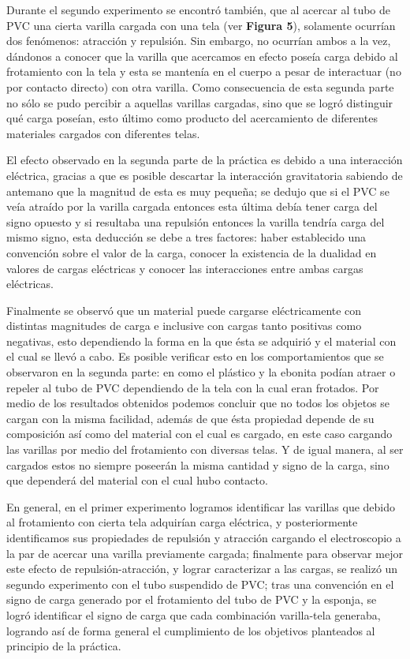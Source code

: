 \documentclass[letterpaper, 11 pt]{article}
\begin{document}
\begin{multicols*}{2}

Durante el segundo experimento se encontró también,  que al acercar al tubo de PVC una cierta varilla cargada con una tela (ver \textbf{Figura 5}), solamente ocurrían dos fenómenos: atracción y repulsión. Sin embargo, no ocurrían ambos a la vez, dándonos a conocer que la varilla que acercamos en efecto poseía carga debido al frotamiento con la tela y esta se mantenía en el cuerpo a pesar de interactuar (no por contacto directo) con otra varilla. Como consecuencia de esta segunda parte no sólo se pudo percibir a aquellas varillas cargadas, sino que se logró distinguir qué carga poseían, esto último como producto del acercamiento de diferentes materiales cargados con diferentes telas.

El efecto observado en la segunda parte de la práctica es debido a una interacción eléctrica, gracias a que es posible descartar la interacción gravitatoria sabiendo de antemano que la magnitud de esta es muy pequeña; se dedujo que si el PVC se veía atraído por la varilla cargada entonces esta última debía tener carga del signo opuesto y si resultaba una repulsión entonces la varilla tendría carga del mismo signo, esta deducción se debe a tres factores: haber establecido una convención sobre el valor de la carga, conocer la existencia de la dualidad en valores de cargas eléctricas y conocer las interacciones entre ambas cargas eléctricas. 

Finalmente se observó que un material puede cargarse eléctricamente con distintas magnitudes de carga e inclusive con cargas tanto positivas como negativas, esto dependiendo la forma en la que ésta se adquirió y el material con el cual se llevó a cabo. Es posible verificar esto en los comportamientos que se observaron en la segunda parte: en como el plástico y la ebonita podían atraer o repeler al tubo de PVC dependiendo de la tela con la cual eran frotados. Por medio de los resultados obtenidos podemos concluir que no todos los objetos se cargan con la misma facilidad, además de que ésta propiedad depende de su composición así como del material con el cual es cargado, en este caso cargando las varillas por medio del frotamiento con diversas telas. Y de igual manera, al ser cargados estos no siempre poseerán la misma cantidad y signo de la  carga, sino que dependerá del material con el cual hubo contacto. 

En general, en el primer experimento logramos identificar las varillas que debido al frotamiento con cierta tela adquirían carga eléctrica, y posteriormente identificamos sus propiedades de repulsión y atracción cargando el electroscopio a la par de acercar una varilla previamente cargada; finalmente para observar mejor este efecto de repulsión-atracción, y lograr caracterizar a las cargas, se realizó un segundo experimento con el tubo suspendido de PVC; tras una convención en el signo de carga generado por el frotamiento del tubo de PVC y la esponja, se logró identificar el signo de carga que cada combinación varilla-tela generaba, logrando así de forma general el cumplimiento de los objetivos planteados al principio de la práctica.

\nocite{*}




\end{multicols*}
\end{document}
